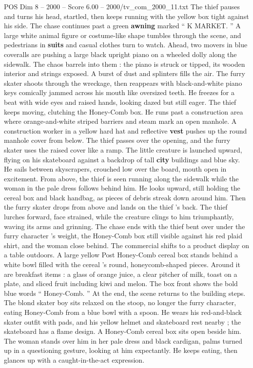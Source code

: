 \begin{textsample}{POS Dim 8 – 2000 – Score 6.00 – 2000/tv\_com\_2000\_11.txt}
The thief pauses and turns his head, startled, then keeps running with the yellow box tight against his side.
The chase continues past a green \textbf{awning} marked “ K MARKET. ” A large white animal figure or costume-like shape tumbles through the scene, and pedestrians in \textbf{suits} and casual clothes turn to watch.
Ahead, two movers in blue coveralls are pushing a large black upright piano on a wheeled dolly along the sidewalk.
The chaos barrels into them : the piano is struck or tipped, its wooden interior and strings exposed.
A burst of dust and splinters fills the air.
The furry skater shoots through the wreckage, then reappears with black-and-white piano keys comically jammed across his mouth like oversized teeth.
He freezes for a beat with wide eyes and raised hands, looking dazed but still eager.
The thief keeps moving, clutching the Honey-Comb box.
He runs past a construction area where orange-and-white striped barriers and steam mark an open manhole.
A construction worker in a yellow hard hat and reflective \textbf{vest} pushes up the round manhole cover from below.
The thief passes over the opening, and the furry skater uses the raised cover like a ramp.
The little creature is launched upward, flying on his skateboard against a backdrop of tall \textbf{city} buildings and blue sky.
He sails between skyscrapers, crouched low over the board, mouth open in excitement.
From above, the thief is seen running along the sidewalk while the woman in the pale dress follows behind him.
He looks upward, still holding the cereal box and black handbag, as pieces of debris streak down around him.
Then the furry skater drops from above and lands on the thief ’s back.
The thief lurches forward, face strained, while the creature clings to him triumphantly, waving its arms and grinning.
The chase ends with the thief bent over under the furry character ’s weight, the Honey-Comb box still visible against his red plaid shirt, and the woman close behind.
The commercial shifts to a product display on a table outdoors.
A large yellow Post Honey-Comb cereal box stands behind a white bowl filled with the cereal ’s round, honeycomb-shaped pieces.
Around it are breakfast items : a glass of orange juice, a clear pitcher of milk, toast on a plate, and sliced fruit including kiwi and melon.
The box front shows the bold blue words “ Honey-Comb. ” At the end, the scene returns to the building steps.
The blond skater boy sits relaxed on the stoop, no longer the furry character, eating Honey-Comb from a blue bowl with a spoon.
He wears his red-and-black skater outfit with pads, and his yellow helmet and skateboard rest nearby ; the skateboard has a flame design.
A Honey-Comb cereal box sits open beside him.
The woman stands over him in her pale dress and black cardigan, palms turned up in a questioning gesture, looking at him expectantly.
He keeps eating, then glances up with a caught-in-the-act expression.

\end{textsample}

